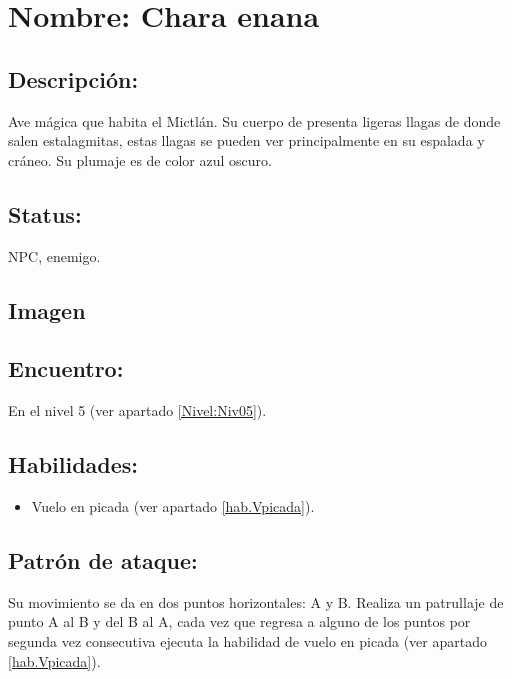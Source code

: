 \section{Nombre: Chara enana}   \label{per:chara}
\subsection{Descripción:}
Ave mágica que habita el Mictlán. Su cuerpo de presenta ligeras llagas de donde salen estalagmitas, estas llagas se pueden ver principalmente en su espalada y cráneo. Su plumaje es de color azul oscuro. 
\subsection{Status:}
NPC, enemigo.
\subsection{Imagen}

\subsection{Encuentro:}
En el nivel 5 (ver apartado \ref{Nivel:Niv05}).
\subsection{Habilidades:}
\begin{itemize}
	\item Vuelo en picada (ver apartado \ref{hab.Vpicada}).
\end{itemize}
\subsection{Patrón de ataque:}
Su movimiento se da en dos puntos horizontales: A y B. Realiza un patrullaje de punto A al B y del B al A, cada vez que regresa a alguno de los puntos por segunda vez consecutiva ejecuta la habilidad de vuelo en picada (ver apartado \ref{hab.Vpicada}).
